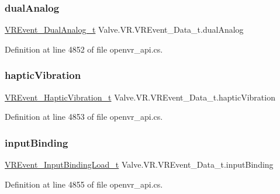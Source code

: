 \subsubsection{\texorpdfstring{dualAnalog}{dualAnalog}}
{\footnotesize\ttfamily \mbox{\hyperlink{struct_valve_1_1_v_r_1_1_v_r_event___dual_analog__t}{V\+R\+Event\+\_\+\+Dual\+Analog\+\_\+t}} Valve.\+V\+R.\+V\+R\+Event\+\_\+\+Data\+\_\+t.\+dual\+Analog}



Definition at line 4852 of file openvr\+\_\+api.\+cs.

\mbox{\label{struct_valve_1_1_v_r_1_1_v_r_event___data__t_adba334daf635a6a6ae49d2551a2fbc75}} 
\subsubsection{\texorpdfstring{hapticVibration}{hapticVibration}}
{\footnotesize\ttfamily \mbox{\hyperlink{struct_valve_1_1_v_r_1_1_v_r_event___haptic_vibration__t}{V\+R\+Event\+\_\+\+Haptic\+Vibration\+\_\+t}} Valve.\+V\+R.\+V\+R\+Event\+\_\+\+Data\+\_\+t.\+haptic\+Vibration}



Definition at line 4853 of file openvr\+\_\+api.\+cs.

\mbox{\label{struct_valve_1_1_v_r_1_1_v_r_event___data__t_ad90c6b072feaaf9fc4bd0fc4503b77bd}} 
\subsubsection{\texorpdfstring{inputBinding}{inputBinding}}
{\footnotesize\ttfamily \mbox{\hyperlink{struct_valve_1_1_v_r_1_1_v_r_event___input_binding_load__t}{V\+R\+Event\+\_\+\+Input\+Binding\+Load\+\_\+t}} Valve.\+V\+R.\+V\+R\+Event\+\_\+\+Data\+\_\+t.\+input\+Binding}



Definition at line 4855 of file openvr\+\_\+api.\+cs.

\mbox{\label{struct_valve_1_1_v_r_1_1_v_r_event___data__t_aa9a748c9f2357baa810ef62ffd6f5f4e}} 
